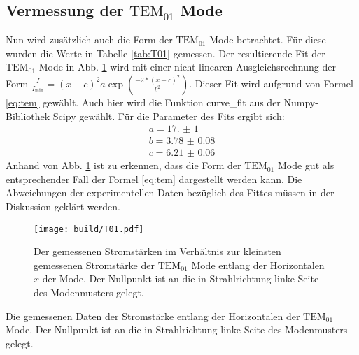 \subsection{Vermessung der $\text{TEM}_{01}$ Mode}
Nun wird zusätzlich auch die Form der $\text{TEM}_\text{01}$ Mode betrachtet. Für diese wurden die Werte in Tabelle \ref{tab:T01} gemessen. 
Der resultierende Fit der $\text{TEM}_\text{01}$ Mode in Abb. \ref{fig:T01} wird mit einer nicht linearen Ausgleichsrechnung der Form $\frac{I}{I_\text{min}} =  (x-c)^2 a \exp \left( \frac{-2*(x-c)^2}{b^2}\right)$. Dieser Fit wird aufgrund von Formel \eqref{eq:tem} gewählt. Auch hier wird die Funktion curve\_fit aus der Numpy-Bibliothek Scipy \cite{scipy} gewählt. Für die Parameter des Fits ergibt sich:
\begin{gather*}
a = \num{17.(1)}\\
b = \num{3.78(8)}\\
c = \num{6.21(6)}
\end{gather*}
Anhand von Abb. \ref{fig:T01} ist zu erkennen, dass die Form der $\text{TEM}_\text{01}$ Mode gut als entsprechender Fall der Formel \eqref{eq:tem} dargestellt werden kann. Die Abweichungen der experimentellen Daten bezüglich des Fittes müssen in der Diskussion geklärt werden.

\begin{figure}
	\centering
	\texttt{[image: build/T01.pdf]}
	\caption{Der gemessenen Stromstärken im Verhältnis zur kleinsten gemessenen Stromstärke der $\text{TEM}_{01}$ Mode entlang der Horizontalen $x$ der Mode. Der Nullpunkt ist an die in Strahlrichtung linke Seite des Modenmusters gelegt.}
	\label{fig:T01}
\end{figure}

\begin{table}
	\centering
	\caption{Die gemessenen Daten der Stromstärke entlang der Horizontalen der $\text{TEM}_{\text{01}}$ Mode. Der Nullpunkt ist an die in Strahlrichtung linke Seite des Modenmusters gelegt.}
	
	
	\label{tab:T01}
\end{table}

